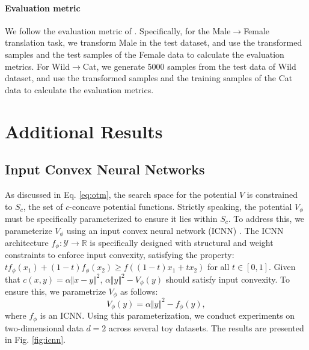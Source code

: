 \paragraph{Evaluation metric}
We follow the evaluation metric of \citet{diotm}.
Specifically, for the Male$\rightarrow$Female translation task, we transform Male in the test dataset, and use the transformed samples and the test samples of the Female data to calculate the evaluation metrics. For Wild$\rightarrow$Cat, we generate 5000 samples from the test data of Wild dataset, and use the transformed samples and the training samples of the Cat data to calculate the evaluation metrics.

\clearpage

\section{Additional Results}

\subsection{Input Convex Neural Networks}

As discussed in Eq. \ref{eq:otm}, the search space for the potential $V$ is constrained to $S_c$, the set of $c$-concave potential functions. Strictly speaking, the potential $V_\phi$ must be specifically parameterized to ensure it lies within $S_c$.
To address this, we parameterize $V_\phi$ using an input convex neural network (ICNN) \cite{icnn, icnn-korotin}. The ICNN architecture $f_\phi: \mathcal{Y} \to \mathbb{R}$ is specifically designed with structural and weight constraints to enforce input convexity, satisfying the property: $ t f_\phi (x_1) + (1-t) f_\phi (x_2) \geq f((1-t)x_1 + t x_2)$ for all $t\in [0,1]$.
Given that $c(x,y) = \alpha \Vert x - y \Vert^2 $, $\alpha \Vert y \Vert^2 - V_\phi(y)$ should satisfy input convexity. To ensure this, we parametrize $V_\phi$ as follows:
\begin{equation}
    V_\phi (y) = \alpha \Vert y \Vert^2 - f_\phi (y),
\end{equation}
where $f_\phi$ is an ICNN.
Using this parameterization, we conduct experiments on two-dimensional data $d=2$ across several toy datasets. The results are presented in Fig. \ref{fig:icnn}.


